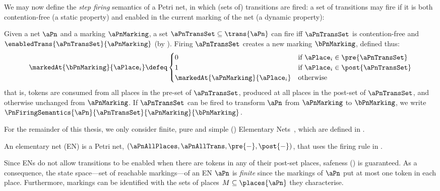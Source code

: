 We may now define the \emph{step firing} semantics of a Petri net, in which
(sets of) transitions are fired: a set of transitions may fire if it is both
contention-free (a static property) and enabled in the current marking of the
net (a dynamic property):

\begin{definition} \label{defn:firePetriTransitions}
Given a net $\aPn$ and a marking $\aPnMarking$, a set $\aPnTransSet \subseteq
\trans{\aPn}$ can fire iff $\aPnTransSet$ is contention-free and
$\enabledTrans{\aPnTransSet}{\aPnMarking}$ (by ).
Firing $\aPnTransSet$ creates a new marking $\bPnMarking$, defined thus:
\[
    \markedAt{\bPnMarking}{\aPlace_i} \defeq \begin{cases}
        0 & \mbox{if } \aPlace_i \in \pre{\aPnTransSet} \\
        1 & \mbox{if } \aPlace_i \in \post{\aPnTransSet} \\
        \markedAt{\aPnMarking}{\aPlace_i} & \mbox{otherwise}
    \end{cases}
\]
that is, tokens are consumed from all places in the pre-set of $\aPnTransSet$,
produced at all places in the post-set of $\aPnTransSet$, and otherwise
unchanged from $\aPnMarking$. If $\aPnTransSet$ can be fired to transform
$\aPn$ from $\aPnMarking$ to $\bPnMarking$, we write
$\PnFiringSemantics{\aPn}{\aPnTransSet}{\aPnMarking}{\bPnMarking}$.
\end{definition}

For the remainder of this thesis, we only consider finite, pure and simple
() Elementary Nets~\cite{Thiagarajan1987}, which are
defined in .

\begin{definition}\label{defn:EN}
    An elementary net (EN) is a Petri net,
    $(\aPnAllPlaces,\aPnAllTrans,\pre{-},\post{-})$, that uses the firing rule
    in .
\end{definition}

Since ENs do not allow transitions to be enabled when there are tokens in any
of their post-set places, safeness () is guaranteed.
As a consequence, the state space---set of reachable markings---of an EN $\aPn$
is \emph{finite} since the markings of $\aPn$ put at most one token in each
place.  Furthermore, markings can be identified with the sets of places $M
\subseteq \places{\aPn}$ they characterise.


